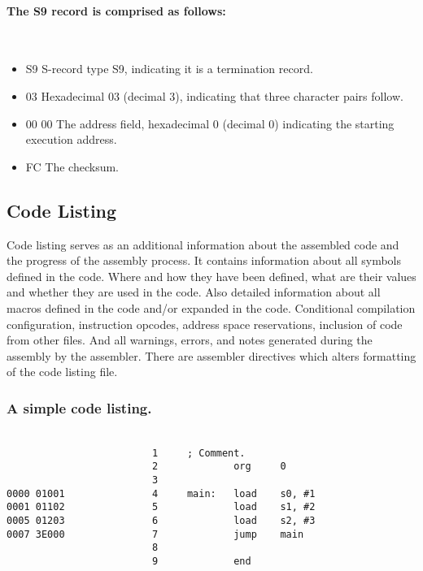             \paragraph{The S9 record is comprised as follows:}
                ~\\
                \begin{itemize}
                    \item S9 S-record type S9, indicating it is a termination record.
                    \item 03 Hexadecimal 03 (decimal 3), indicating that three character pairs follow.
                    \item 00 00 The address field, hexadecimal 0 (decimal 0) indicating the starting execution address.
                    \item FC The checksum.
                \end{itemize}

    \subsection{Code Listing}
        Code listing serves as an additional information about the assembled code and the progress of the assembly process. It contains information about all symbols defined in the code. Where and how they have been defined, what are their values and whether they are used in the code. Also detailed information about all macros defined in the code and/or expanded in the code. Conditional compilation configuration, instruction opcodes, address space reservations, inclusion of code from other files. And all warnings, errors, and notes generated during the assembly by the assembler. There are assembler directives which alters formatting of the code listing file.

        \subsubsection{A simple code listing.}
            ~\\
            \verb'                         1     ; Comment.'\\
            \verb'                         2             org     0'\\
            \verb'                         3'\\
            \verb'0000 01001               4     main:   load    s0, #1'\\
            \verb'0001 01102               5             load    s1, #2'\\
            \verb'0005 01203               6             load    s2, #3'\\
            \verb'0007 3E000               7             jump    main'\\
            \verb'                         8'\\
            \verb'                         9             end'\\

